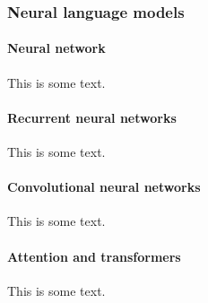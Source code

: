 \subsubsection{Neural language models}
\label{sub:neural_language_models}

\paragraph{Neural network}
This is some text.

\paragraph{Recurrent neural networks}
This is some text.

\paragraph{Convolutional neural networks}
This is some text.

\paragraph{Attention and transformers}
This is some text.